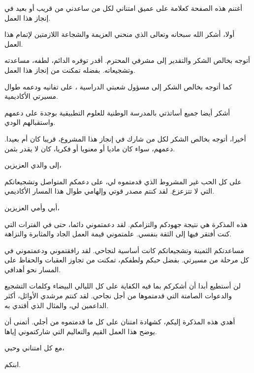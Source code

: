 \documentclass[12pt,a4paper]{article}
\begin{document}
\thispagestyle{empty}
\vspace*{0.5cm}
\begin{center}
{\Large {}}
\end{center}
\vspace{0.5cm}

\begin{RLtext}
أغتنم هذه الصفحة كعلامة على عميق امتناني لكل من ساعدني من قريب أو بعيد في إنجاز هذا العمل.

أولا، أشكر الله سبحانه وتعالى الذي منحني العزيمة والشجاعة اللازمتين لإتمام هذا العمل.

أتوجه بخالص الشكر والتقدير إلى مشرفي المحترم. أقدر توفره الدائم، لطفه، مساعدته وتشجيعاته. بفضله تمكنت من إنجاز هذا العمل.

كما أتوجه بخالص الشكر إلى مسؤول شعبتي الدراسية ، على تفانيه ودعمه طوال مسيرتي الأكاديمية.

أشكر أيضا جميع أساتذتي بالمدرسة الوطنية للعلوم التطبيقية بوجدة على دعمهم واستقبالهم الودي.

أخيرا، أتوجه بخالص الشكر لكل من شارك في إنجاز هذا المشروع، قريبا كان أم بعيدا. دعمهم، سواء كان ماديا أو معنويا أو فكريا، كان لا يقدر بثمن.
\end{RLtext}

\newpage



\thispagestyle{empty}
\vspace*{0.5cm}
\begin{center}
{\Large {}}
\end{center}
\vspace{0.5cm}

\begin{RLtext}
إلى والدي العزيزين،

على كل الحب غير المشروط الذي قدمتموه لي، على دعمكم المتواصل وتشجيعاتكم التي لا تتزعزع. لقد كنتم مصدر قوتي وإلهامي طوال هذا المسار الأكاديمي.

أبي وأمي العزيزين،

هذه المذكرة هي نتيجة جهودكم والتزامكم. لقد دعمتموني دائما، حتى في الفترات التي كنت أفتقر فيها إلى الثقة بنفسي. علمتموني قيمة العمل الجاد والمثابرة والنزاهة.

مساعدتكم الثمينة وتشجيعاتكم كانت أساسية لنجاحي. لقد رافقتموني ودعمتموني في كل مرحلة من مسيرتي. بفضل حبكم ولطفكم، تمكنت من تجاوز العقبات والحفاظ على المسار نحو أهدافي.

لن أستطيع أبدا أن أشكركم بما فيه الكفاية على كل الليالي البيضاء وكلمات التشجيع والدعوات الصامتة التي قدمتموها من أجل نجاحي. لقد كنتم مرشدي الأوائل، أكثر الداعمين لي، والمثال الذي أقتدي به.

أهدي هذه المذكرة إليكم، كشهادة امتنان على كل ما قدمتموه من أجلي. أتمنى أن يوضح هذا العمل القيم والتعاليم التي شاركتموني إياها.

مع كل امتناني وحبي،

ابنكم.
\end{RLtext}
\end{document}
